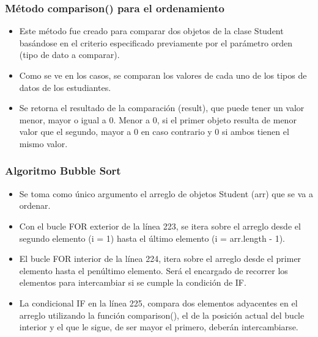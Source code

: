 \documentclass{article}
\begin{document}
        
    \subsubsection{Método comparison() para el ordenamiento}

    

        \begin{itemize}	
            \item Este método fue creado para comparar dos objetos de la clase Student basándose en el criterio especificado previamente por el parámetro orden (tipo de dato a comparar).
            \item Como se ve en los casos, se comparan los valores de cada uno de los tipos de datos de los estudiantes.
            \item Se retorna el resultado de la comparación (result), que puede tener un valor menor, mayor o igual a 0. Menor a 0, si el primer objeto resulta de menor valor que el segundo, mayor a 0 en caso contrario y 0 si ambos tienen el mismo valor.
        \end{itemize}

    
    \subsubsection{Algoritmo Bubble Sort}
        
    
     
        \begin{itemize}	
            \item Se toma como único argumento el arreglo de objetos Student (arr) que se va a ordenar.
            \item Con el bucle FOR exterior de la línea 223, se itera sobre el arreglo desde el segundo elemento (i = 1) hasta el último elemento (i = arr.length - 1).
            \item El bucle FOR interior de la línea 224, itera sobre el arreglo desde el primer elemento hasta el penúltimo elemento. Será el encargado de recorrer los elementos para intercambiar si se cumple la condición de IF.
            \item La condicional IF en la línea 225, compara dos elementos adyacentes en el arreglo utilizando la función comparison(), el de la posición actual del bucle interior y el que le sigue, de ser mayor el primero, deberán intercambiarse.
        \end{itemize}
\end{document}
